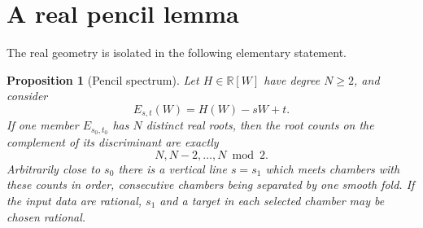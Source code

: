 \documentclass[11pt]{article}
\newtheorem{proposition}[theorem]{Proposition}
\newcommand{\R}{\mathbb R}
\numberwithin{equation}{section}
\begin{document}
\section{A real pencil lemma}

The real geometry is isolated in the following elementary statement.

\begin{proposition}[Pencil spectrum]\label{prop:pencil}
Let \(H\in\R[W]\) have degree \(N\geq2\), and consider
\[
 E_{s,t}(W)=H(W)-sW+t.
\]
If one member \(E_{s_0,t_0}\) has \(N\) distinct real roots, then the root
counts on the complement of its discriminant are exactly
\[
 N,N-2,\ldots,N\bmod2.
\]
Arbitrarily close to \(s_0\) there is a vertical line \(s=s_1\) which meets
chambers with these counts in order, consecutive chambers being separated
by one smooth fold.  If the input data are rational, \(s_1\) and a target in
each selected chamber may be chosen rational.
\end{proposition}
\end{document}
